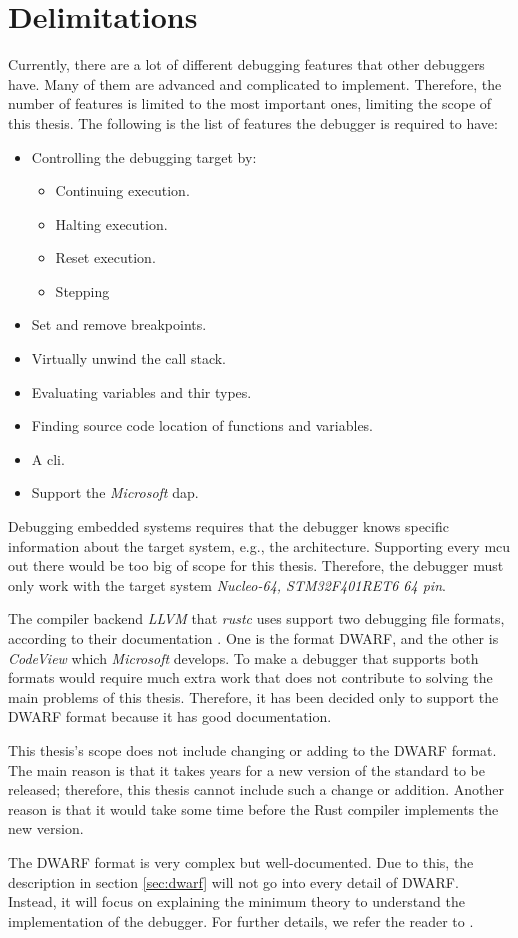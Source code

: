 \section{Delimitations}
\label{sec:delimitations}
Currently, there are a lot of different debugging features that other debuggers have.
Many of them are advanced and complicated to implement.
Therefore, the number of features is limited to the most important ones, limiting the scope of this thesis.
The following is the list of features the debugger is required to have:


\begin{itemize} \label{list:debuggerfeatures}
  \item Controlling the debugging target by:
  \begin{itemize}
    \item Continuing execution.
    \item Halting execution.
    \item Reset execution.
    \item Stepping
  \end{itemize}
  \item Set and remove breakpoints.
  \item Virtually unwind the call stack.
  \item Evaluating variables and thir types.
  \item Finding source code location of functions and variables.
  \item A \acrfull{cli}.
  \item Support the \emph{Microsoft} \acrfull{dap}.
\end{itemize}


Debugging embedded systems requires that the debugger knows specific information about the target system, e.g., the architecture.
Supporting every \gls{mcu} out there would be too big of scope for this thesis.
Therefore, the debugger must only work with the target system \emph{Nucleo-64, STM32F401RET6 64 pin}.


The compiler backend \emph{LLVM} that \emph{rustc} uses support two debugging file formats, according to their documentation \cite{llvm-dbs}.
One is the format \gls{DWARF}, and the other is \emph{CodeView} which \emph{Microsoft} develops.
To make a debugger that supports both formats would require much extra work that does not contribute to solving the main problems of this thesis.
Therefore, it has been decided only to support the \gls{DWARF} format because it has good documentation.


This thesis's scope does not include changing or adding to the \gls{DWARF} format.
The main reason is that it takes years for a new version of the standard to be released; therefore, this thesis cannot include such a change or addition.
Another reason is that it would take some time before the Rust compiler implements the new version.


The \gls{DWARF} format is very complex but well-documented.
Due to this, the description in section \ref{sec:dwarf} will not go into every detail of \gls{DWARF}.
Instead, it will focus on explaining the minimum theory to understand the implementation of the debugger.
For further details, we refer the reader to \cite{dwarf}.

